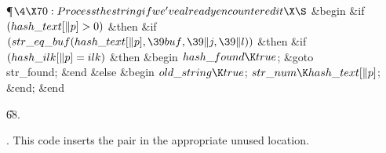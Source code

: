 \Y\P$\4\X70:Process the string if we've already encountered it\X\S$\6
\&{begin} \&{if} $(\\{hash\_text}[\|p]>0)$ \1\&{then}\6
\&{if} $(\\{str\_eq\_buf}(\\{hash\_text}[\|p],\39\\{buf},\39\|j,\39\|l))$ \1%
\&{then}\6
\&{if} $(\\{hash\_ilk}[\|p]=\\{ilk})$ \1\&{then}%
\6
\&{begin} $\\{hash\_found}\K\\{true}$;\5
\&{goto} \\{str\_found};\6
\&{end}\6
\4\&{else} \&{begin} \6
$\\{old\_string}\K\\{true}$;\5
$\\{str\_num}\K\\{hash\_text}[\|p]$;\6
\&{end};\2\2\2\6
\&{end}\par
\U68.\fi

.
This code inserts the pair in the appropriate unused location.

